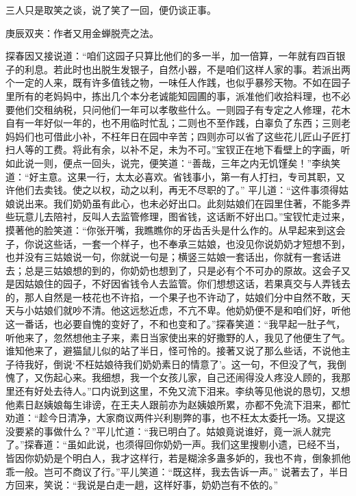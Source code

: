 \begin{parag}
    三人只是取笑之谈，说了笑了一回，便仍谈正事。\begin{note}庚辰双夹：作者又用金蝉脱壳之法。\end{note}探春因又接说道：“咱们这园子只算比他们的多一半，加一倍算，一年就有四百银子的利息。若此时也出脱生发银子，自然小器，不是咱们这样人家的事。若派出两个一定的人来，既有许多值钱之物，一味任人作践，也似乎暴殄天物。不如在园子里所有的老妈妈中，拣出几个本分老诚能知园圃的事，派准他们收拾料理，也不必要他们交租纳税，只问他们一年可以孝敬些什么。一则园子有专定之人修理，花木自有一年好似一年的，也不用临时忙乱；二则也不至作践，白辜负了东西；三则老妈妈们也可借此小补，不枉年日在园中辛苦；四则亦可以省了这些花儿匠山子匠打扫人等的工费。将此有余，以补不足，未为不可。”宝钗正在地下看壁上的字画，听如此说一则，便点一回头，说完，便笑道：“善哉，三年之内无饥馑矣！”李纨笑道：“好主意。这果一行，太太必喜欢。省钱事小，第一有人打扫，专司其职，又许他们去卖钱。使之以权，动之以利，再无不尽职的了。” 平儿道：“这件事须得姑娘说出来。我们奶奶虽有此心，也未必好出口。此刻姑娘们在园里住著，不能多弄些玩意儿去陪衬，反叫人去监管修理，图省钱，这话断不好出口。”宝钗忙走过来，摸著他的脸笑道：“你张开嘴，我瞧瞧你的牙齿舌头是什么作的。从早起来到这会子，你说这些话，一套一个样子，也不奉承三姑娘，也没见你说奶奶才短想不到，也并没有三姑娘说一句，你就说一句是；横竖三姑娘一套话出，你就有一套话进去；总是三姑娘想的到的，你奶奶也想到了，只是必有个不可办的原故。这会子又是因姑娘住的园子，不好因省钱令人去监管。你们想想这话，若果真交与人弄钱去的，那人自然是一枝花也不许掐，一个果子也不许动了，姑娘们分中自然不敢，天天与小姑娘们就吵不清。他这远愁近虑，不亢不卑。他奶奶便不是和咱们好，听他这一番话，也必要自愧的变好了，不和也变和了。”探春笑道：“我早起一肚子气，听他来了，忽然想他主子来，素日当家使出来的好撒野的人，我见了他便生了气。谁知他来了，避猫鼠儿似的站了半日，怪可怜的。接著又说了那么些话，不说他主子待我好，倒说‘不枉姑娘待我们奶奶素日的情意了’。这一句，不但没了气，我倒愧了，又伤起心来。我细想，我一个女孩儿家，自己还闹得没人疼没人顾的，我那里还有好处去待人。”口内说到这里，不免又流下泪来。李纨等见他说的恳切，又想他素日赵姨娘每生诽谤，在王夫人跟前亦为赵姨娘所累，亦都不免流下泪来，都忙劝道：“趁今日清净，大家商议两件兴利剔弊的事，也不枉太太委托一场。又提这没要紧的事做什么？”平儿忙道：“我已明白了。姑娘竟说谁好，竟一派人就完了。”探春道：“虽如此说，也须得回你奶奶一声。我们这里搜剔小遗，已经不当，皆因你奶奶是个明白人，我才这样行，若是糊涂多蛊多妒的，我也不肯，倒象抓他乖一般。岂可不商议了行。”平儿笑道：“既这样，我去告诉一声。” 说著去了，半日方回来，笑说：“我说是白走一趟，这样好事，奶奶岂有不依的。”
\end{parag}


